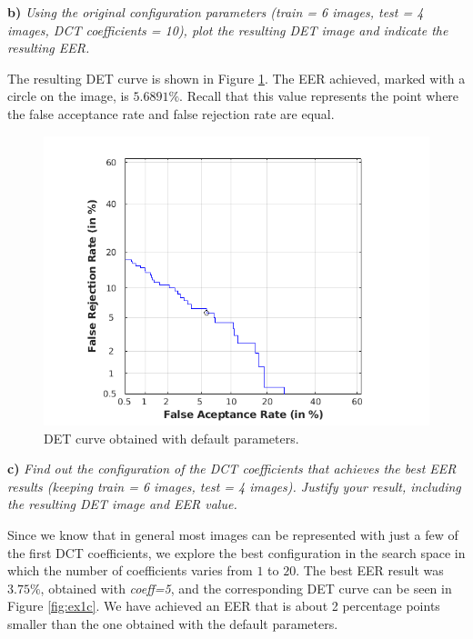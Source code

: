 \documentclass[11pt]{article}
\begin{document}
\textbf{b)} \emph{Using the original configuration parameters (train = 6 images, test = 4 images, DCT coefficients = 10), plot the resulting DET image and indicate the resulting EER.}

The resulting DET curve is shown in Figure \ref{fig:ex1b}. The EER achieved, marked with a circle on the image, is $5.6891\%$. Recall that this value represents the point where the false acceptance rate and false rejection rate are equal.

\begin{figure}[h!]
  \centering
    \includegraphics[scale=0.65]{img/1b_det}
    \caption{DET curve obtained with default parameters.}
    \label{fig:ex1b}
\end{figure}

\textbf{c)} \emph{Find out the configuration of the DCT coefficients that achieves the best EER results (keeping train = 6 images, test = 4 images). Justify your result, including the resulting DET image and EER value.}

Since we know that in general most images can be represented with just a few of the first DCT coefficients, we explore the best configuration in the search space in which the number of coefficients varies from $1$ to $20$. The best EER result was $3.75\%$, obtained with \textit{coeff=5}, and the corresponding DET curve can be seen in Figure \ref{fig:ex1c}. We have achieved an EER that is about 2 percentage points smaller than the one obtained with the default parameters.
\end{document}
